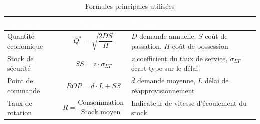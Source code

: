 \documentclass[12pt, a4paper, oneside]{report}
\begin{document}
\begin{table}[H]
  \centering
  \caption{Formules principales utilisées}
  \label{tab:formules}
  \renewcommand{\arraystretch}{1.6}
  \small
  \begin{tabularx}{\textwidth}{|l|c|X|}
    \hline
    \rowcolor{iacsTableHead}
    \textcolor{white}{\textbf{Grandeur}} &
    \textcolor{white}{\textbf{Formule}} &
    \textcolor{white}{\textbf{Paramètres}} \\
    \hline
    Quantité économique &
    $Q^{*} = \sqrt{\dfrac{2DS}{H}}$ &
    $D$ demande annuelle, $S$ coût de passation, $H$ coût de possession \\
    \hline
    \rowcolor{iacsLightGray}
    Stock de sécurité &
    $SS = z \cdot \sigma_{LT}$ &
    $z$ coefficient du taux de service, $\sigma_{LT}$ écart-type sur le délai \\
    \hline
    Point de commande &
    $ROP = \bar{d} \cdot L + SS$ &
    $\bar{d}$ demande moyenne, $L$ délai de réapprovisionnement \\
    \hline
    \rowcolor{iacsLightGray}
    Taux de rotation &
    $R = \dfrac{\text{Consommation}}{\text{Stock moyen}}$ &
    Indicateur de vitesse d'écoulement du stock \\
    \hline
  \end{tabularx}
\end{table}
\end{document}
